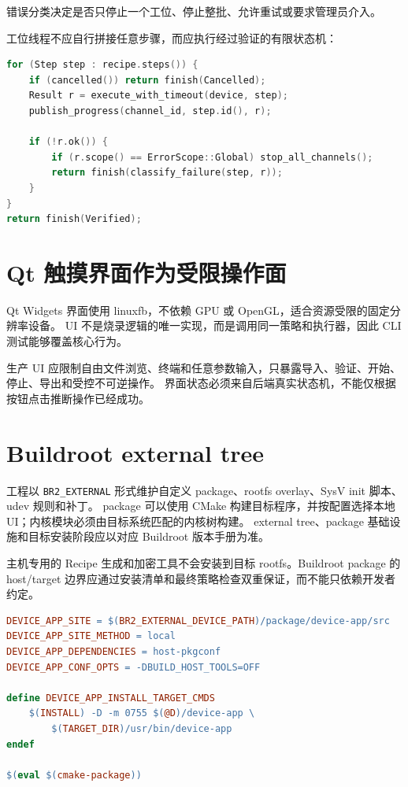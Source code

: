 错误分类决定是否只停止一个工位、停止整批、允许重试或要求管理员介入。

工位线程不应自行拼接任意步骤，而应执行经过验证的有限状态机：

\begin{lstlisting}[language=C++,caption={多工位执行器的状态机骨架（伪代码）}]
for (Step step : recipe.steps()) {
    if (cancelled()) return finish(Cancelled);
    Result r = execute_with_timeout(device, step);
    publish_progress(channel_id, step.id(), r);

    if (!r.ok()) {
        if (r.scope() == ErrorScope::Global) stop_all_channels();
        return finish(classify_failure(step, r));
    }
}
return finish(Verified);
\end{lstlisting}

\section{Qt 触摸界面作为受限操作面}

Qt Widgets 界面使用 linuxfb，不依赖 GPU 或 OpenGL，适合资源受限的固定分辨率设备。
UI 不是烧录逻辑的唯一实现，而是调用同一策略和执行器，因此 CLI 测试能够覆盖核心行为。

生产 UI 应限制自由文件浏览、终端和任意参数输入，只暴露导入、验证、开始、停止、导出和受控不可逆操作。
界面状态必须来自后端真实状态机，不能仅根据按钮点击推断操作已经成功。

\section{Buildroot external tree}

工程以 \texttt{BR2\_EXTERNAL} 形式维护自定义 package、rootfs overlay、SysV init 脚本、udev 规则和补丁。
package 可以使用 CMake 构建目标程序，并按配置选择本地 UI；内核模块必须由目标系统匹配的内核树构建。
external tree、package 基础设施和目标安装阶段应以对应 Buildroot 版本手册为准\cite{buildroot-manual}。

主机专用的 Recipe 生成和加密工具不会安装到目标 rootfs。Buildroot package 的 host/target 边界应通过安装清单和最终策略检查双重保证，而不能只依赖开发者约定。

\begin{lstlisting}[language=make,caption={Buildroot 目标软件包的最小结构（示意）}]
DEVICE_APP_SITE = $(BR2_EXTERNAL_DEVICE_PATH)/package/device-app/src
DEVICE_APP_SITE_METHOD = local
DEVICE_APP_DEPENDENCIES = host-pkgconf
DEVICE_APP_CONF_OPTS = -DBUILD_HOST_TOOLS=OFF

define DEVICE_APP_INSTALL_TARGET_CMDS
	$(INSTALL) -D -m 0755 $(@D)/device-app \
		$(TARGET_DIR)/usr/bin/device-app
endef

$(eval $(cmake-package))
\end{lstlisting}

